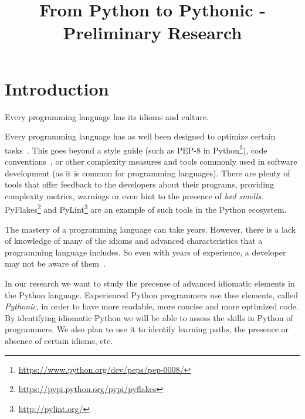 \documentclass[conference]{IEEEtran}
\begin{document}
\title{From Python to Pythonic - Preliminary Research}


\author{
\and
{}
}


\maketitle
\IEEEpeerreviewmaketitle

\section{Introduction}

Every programming language has its idioms and culture.

Every programming language has as well been designed to optimize certain tasks~\cite{coplien1997idioms,coplien1997advanced}. This goes beyond a style guide (such as PEP-8 in Python\footnote{\url{https://www.python.org/dev/peps/pep-0008/}}), code conventions~\cite{allamanis2014learning}, or other complexity measures and tools commonly used in software development (as it is common for programming languages). There are plenty of tools that offer feedback to the developers about their programs, providing complexity metrics, warnings or even hint to the presence of \emph{bad smells}. PyFlakes\footnote{\url{https://pypi.python.org/pypi/pyflakes}} and PyLint\footnote{\url{http://pylint.org/}} are an example of such tools in the Python ecosystem.

The mastery of a programming language can take years. However, there is a lack of knowledge of many of the idioms and advanced characteristics that a programming language includes. So even with years of experience, a developer may not be aware of them~\cite{langtangen2006python}.

In our research we want to study the precense of advanced idiomatic elements in the Python language. Experienced Python programmers use thse elements, called \emph{Pythonic}, in order to have more readable, more concise and more optimized code. By identifying idiomatic Python we will be able to assess the skills in Python of programmers. We also plan to use it to identify learning paths, the presence or absence of certain idioms, etc.
\end{document}
